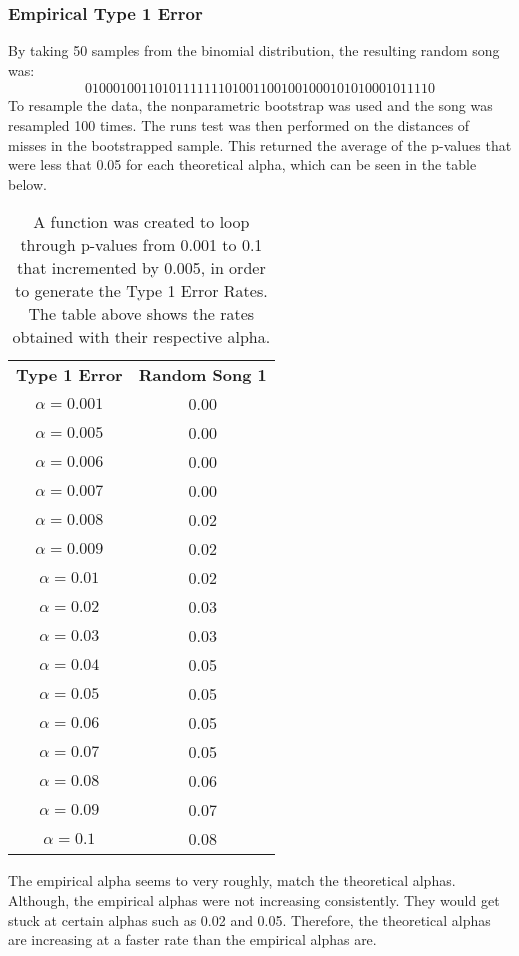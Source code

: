 \documentclass[12pt, letterpaper]{article}
\begin{document}
\subsubsection{Empirical Type 1 Error} 
By taking 50 samples from the binomial distribution, the resulting random song was:
\begin{gather*}
  0 1 0 0 0 1 0 0 1 1 0 1 0 1 1 1 1 1 1 1 0 
  1 0 0 1 1 0 0 1 0 0 1 0 0 0 1 0 1 0 1 0 0
  0 1 0 1 1 1 1 0
\end{gather*} 
To resample the data, the nonparametric bootstrap was used and the song was resampled 100 times. The runs test was then performed on the distances of misses in the bootstrapped sample. This returned the average of the p-values that were less that 0.05 for each theoretical alpha, which can be seen in the table below.
\begin{table}[h]
\begin{center}
\begin{tabular}{|c|c|}
\textbf{Type 1 Error} & \textbf{Random Song 1}\\
$\alpha = 0.001$ & 0.00\\
$\alpha = 0.005$ &  0.00\\
$\alpha = 0.006$ &  0.00\\
$\alpha = 0.007$ & 0.00\\
$\alpha = 0.008$ & 0.02\\
$\alpha = 0.009$ & 0.02\\
$\alpha = 0.01$ & 0.02\\
$\alpha = 0.02$ & 0.03\\
$\alpha = 0.03$ & 0.03\\
$\alpha = 0.04$ & 0.05\\
$\alpha = 0.05$ &  0.05\\
$\alpha = 0.06$ &  0.05\\
$\alpha = 0.07$ &  0.05\\
$\alpha = 0.08$ &  0.06\\
$\alpha = 0.09$ & 0.07\\
$\alpha = 0.1$ & 0.08 \\ 
\end{tabular}
\end{center}
\caption{A function was created to loop through p-values from 0.001 to 0.1 that incremented by 0.005, in order to  generate the Type 1 Error Rates. The table above shows the rates obtained with their respective alpha.}
\label{fig: Type 1 Error Rates for Nonparametric Bootstrap}
\end{table}
The empirical alpha seems to very roughly, match the theoretical alphas. Although, the empirical alphas were not increasing consistently. They would get stuck at certain alphas such as 0.02 and 0.05. Therefore, the theoretical alphas are increasing at a faster rate than the empirical alphas are.
\end{document}
